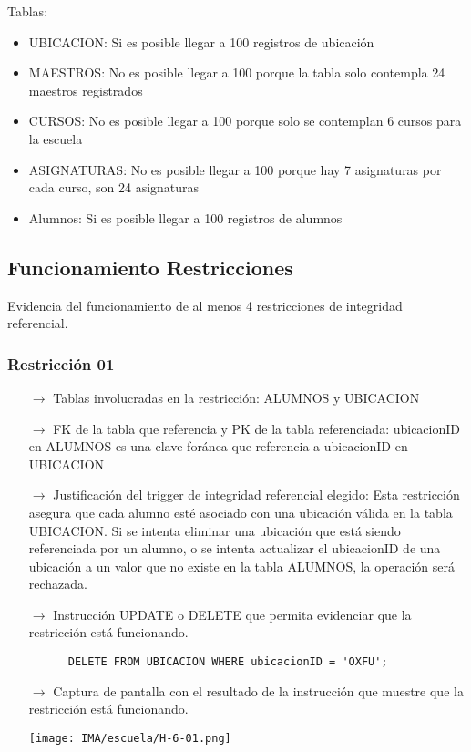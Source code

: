 Tablas:
\begin{itemize}
  \item UBICACION: Si es posible llegar a 100 registros de ubicación 
  \item MAESTROS: No es posible llegar a 100 porque la tabla solo contempla 24 maestros registrados
  \item CURSOS: No es posible llegar a 100 porque solo se contemplan 6 cursos para la escuela
  \item ASIGNATURAS: No es posible llegar a 100 porque hay 7 asignaturas por cada curso, son 24 asignaturas
  \item Alumnos: Si es posible llegar a 100 registros de alumnos
\end{itemize}

\subsection{Funcionamiento Restricciones}

Evidencia del funcionamiento de al menos 4 restricciones de integridad referencial.

\subsubsection*{Restricción 01}

\begin{itemize}
    \item[$\rightarrow$] Tablas involucradas en la restricción: ALUMNOS y UBICACION
    \item[$\rightarrow$] FK de la tabla que referencia y PK de la tabla referenciada: ubicacionID en ALUMNOS es una clave foránea que referencia a ubicacionID en UBICACION
    \item[$\rightarrow$] Justificación del trigger de integridad referencial elegido: Esta restricción asegura que cada alumno esté asociado con una ubicación válida en la tabla UBICACION. Si se intenta eliminar una ubicación que está siendo referenciada por un alumno, o se intenta actualizar el ubicacionID de una ubicación a un valor que no existe en la tabla ALUMNOS, la operación será rechazada.
    \item[$\rightarrow$] Instrucción UPDATE o DELETE que permita evidenciar que la restricción está funcionando.
    \begin{verbatim}
      DELETE FROM UBICACION WHERE ubicacionID = 'OXFU';
    \end{verbatim}
    \item[$\rightarrow$] Captura de pantalla con el resultado de la instrucción que muestre que la restricción está
    funcionando.
    \begin{center}
        \texttt{[image: IMA/escuela/H-6-01.png]}
    \end{center}
\end{itemize}


